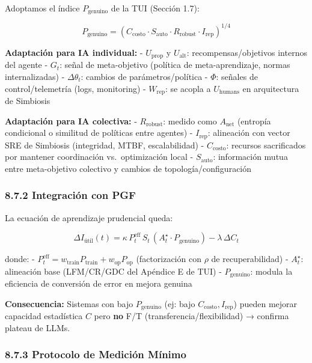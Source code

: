 Adoptamos el índice \(P_{\text{genuino}}\) de la TUI (Sección 1.7):

\[
P_{\text{genuino}} = \left(C_{\text{costo}} \cdot S_{\text{auto}} \cdot R_{\text{robust}} \cdot I_{\text{rep}}\right)^{1/4}
\]

\textbf{Adaptación para IA individual:} - \(U_{\text{prop}}\) y
\(U_{\text{alt}}\): recompensas/objetivos internos del agente - \(G_t\):
señal de meta-objetivo (política de meta-aprendizaje, normas
internalizadas) - \(\Delta\theta_t\): cambios de parámetros/política -
\(\Phi\): señales de control/telemetría (logs, monitoring) -
\(W_{\text{rep}}\): se acopla a \(U_{\text{humans}}\) en arquitectura de
Simbiosis

\textbf{Adaptación para IA colectiva:} - \(R_{\text{robust}}\): medido
como \(A_{\text{net}}\) (entropía condicional o similitud de políticas
entre agentes) - \(I_{\text{rep}}\): alineación con vector SRE de
Simbiosis (integridad, MTBF, escalabilidad) - \(C_{\text{costo}}\):
recursos sacrificados por mantener coordinación vs.~optimización local -
\(S_{\text{auto}}\): información mutua entre meta-objetivo colectivo y
cambios de topología/configuración

\subsubsection{8.7.2 Integración con PGF}\label{integraciuxf3n-con-pgf}

La ecuación de aprendizaje prudencial queda:

\[
\Delta I_{\text{útil}}(t) = \kappa \, P^{\text{eff}}_t \, S_t \, (A_t^\star \cdot P_{\text{genuino}}) - \lambda \, \Delta C_t
\]

donde: -
\(P^{\text{eff}}_t = w_{\text{train}} P_{\text{train}} + w_{\text{op}} P_{\text{op}}\)
(factorización con \(\rho\) de recuperabilidad) - \(A_t^\star\):
alineación base (LFM/CR/GDC del Apéndice E de TUI) -
\(P_{\text{genuino}}\): modula la eficiencia de conversión de error en
mejora genuina

\textbf{Consecuencia:} Sistemas con bajo \(P_{\text{genuino}}\) (ej:
bajo \(C_{\text{costo}}, I_{\text{rep}}\)) pueden mejorar capacidad
estadística \(C\) pero \textbf{no} F/T (transferencia/flexibilidad) →
confirma plateau de LLMs.

\subsubsection{8.7.3 Protocolo de Medición
Mínimo}\label{protocolo-de-mediciuxf3n-muxednimo}

